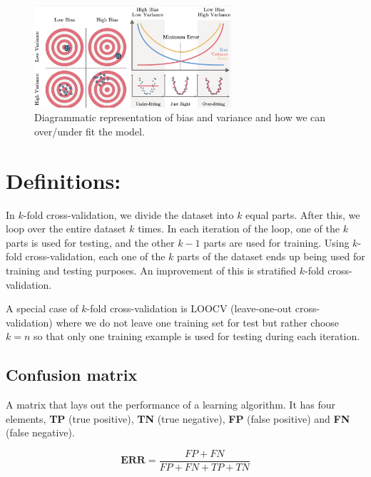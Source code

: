 \documentclass[11pt]{article}
\begin{document}
\begin{figure}
\centering 
\includegraphics[width=0.65\textwidth]{cartoon1.png}
\caption{\label{fig:bias1}Diagrammatic representation of bias and variance and how we can over/under fit the model.}
\end{figure}


\section{Definitions:}


In $k$-fold cross-validation, 
we divide the dataset into $k$ equal parts. 
After this, we loop over the entire dataset $k$ times. 
In each iteration of the loop, one of the $k$ parts is used for testing, 
and the other $k-1$ parts are used for training. 
Using $k$-fold cross-validation, each one 
of the $k$ parts of the dataset ends up 
being used for training and testing purposes.
An improvement of this is stratified $k$-fold cross-validation. 

A special case of $k$-fold cross-validation is LOOCV (leave-one-out cross-validation)
where we do not leave one training set for test but rather choose $k=n$ so that only one training example is
used for testing during each iteration. 



\subsection{Confusion matrix}

A matrix that lays out the performance of a learning algorithm. 
It has four elements, \textbf{TP} (true positive),  \textbf{TN} (true negative), 
\textbf{FP} (false positive) and \textbf{FN} (false negative). 

\begin{equation}
\textbf{ERR} = \frac{FP+FN}{FP+FN+TP+TN} 
\end{equation}
\end{document}
